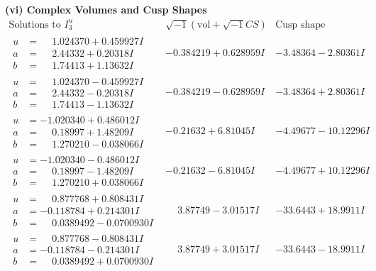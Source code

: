 \documentclass[1p]{elsarticle_modified}
\theoremstyle{definition}
\newcommand{\I}{\sqrt{-1}}
\begin{document}
\newpage\flushleft \textbf{(vi) Complex Volumes and Cusp Shapes}
$$\begin{array}{c|c|c}  
\text{Solutions to }I^u_{3}& \I (\text{vol} + \sqrt{-1}CS) & \text{Cusp shape}\\
 \hline 
\begin{aligned}
u &= \phantom{-}1.024370 + 0.459927 I \\
a &= \phantom{-}2.44332 + 0.20318 I \\
b &= \phantom{-}1.74413 + 1.13632 I\end{aligned}
 & -0.384219 + 0.628959 I & -3.48364 - 2.80361 I \\ \hline\begin{aligned}
u &= \phantom{-}1.024370 - 0.459927 I \\
a &= \phantom{-}2.44332 - 0.20318 I \\
b &= \phantom{-}1.74413 - 1.13632 I\end{aligned}
 & -0.384219 - 0.628959 I & -3.48364 + 2.80361 I \\ \hline\begin{aligned}
u &= -1.020340 + 0.486012 I \\
a &= \phantom{-}0.18997 + 1.48209 I \\
b &= \phantom{-}1.270210 - 0.038066 I\end{aligned}
 & -0.21632 + 6.81045 I & -4.49677 - 10.12296 I \\ \hline\begin{aligned}
u &= -1.020340 - 0.486012 I \\
a &= \phantom{-}0.18997 - 1.48209 I \\
b &= \phantom{-}1.270210 + 0.038066 I\end{aligned}
 & -0.21632 - 6.81045 I & -4.49677 + 10.12296 I \\ \hline\begin{aligned}
u &= \phantom{-}0.877768 + 0.808431 I \\
a &= -0.118784 + 0.214301 I \\
b &= \phantom{-}0.0389492 - 0.0700930 I\end{aligned}
 & \phantom{-}3.87749 - 3.01517 I & -33.6443 + 18.9911 I \\ \hline\begin{aligned}
u &= \phantom{-}0.877768 - 0.808431 I \\
a &= -0.118784 - 0.214301 I \\
b &= \phantom{-}0.0389492 + 0.0700930 I\end{aligned}
 & \phantom{-}3.87749 + 3.01517 I & -33.6443 - 18.9911 I \\ \hline\begin{aligned}

\end{aligned}
\end{array}$$
\end{document}

